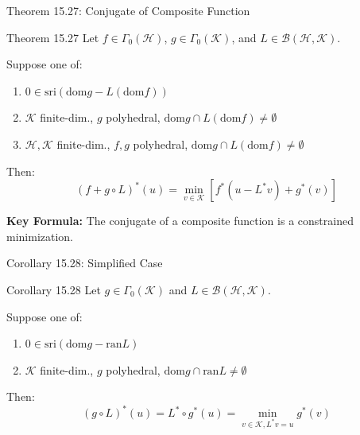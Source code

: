 \documentclass[aspectratio=169,10pt]{beamer}
\begin{document}
\begin{frame}{Theorem 15.27: Conjugate of Composite Function}
  \begin{block}{Theorem 15.27}
    Let $f \in \Gamma_0(\mathcal{H})$, $g \in \Gamma_0(\mathcal{K})$, and $L \in \mathcal{B}(\mathcal{H}, \mathcal{K})$.
    
    Suppose one of:
    \begin{enumerate}
      \item[(i)] $0 \in \text{sri}(\text{dom} g - L(\text{dom} f))$
      \item[(ii)] $\mathcal{K}$ finite-dim., $g$ polyhedral, $\text{dom} g \cap L(\text{dom} f) \neq \emptyset$
      \item[(iii)] $\mathcal{H}, \mathcal{K}$ finite-dim., $f, g$ polyhedral, $\text{dom} g \cap L(\text{dom} f) \neq \emptyset$
    \end{enumerate}
    
    Then:
    \[
      (f + g \circ L)^*(u) = \min_{v \in \mathcal{K}} [f^*(u - L^*v) + g^*(v)]
    \]
  \end{block}
  
  \vspace{0.3cm}
  \textbf{Key Formula:} The conjugate of a composite function is a constrained minimization.
\end{frame}

\begin{frame}{Corollary 15.28: Simplified Case}
  \begin{block}{Corollary 15.28}
    Let $g \in \Gamma_0(\mathcal{K})$ and $L \in \mathcal{B}(\mathcal{H}, \mathcal{K})$.
    
    Suppose one of:
    \begin{enumerate}
      \item[(i)] $0 \in \text{sri}(\text{dom} g - \text{ran} L)$
      \item[(ii)] $\mathcal{K}$ finite-dim., $g$ polyhedral, $\text{dom} g \cap \text{ran} L \neq \emptyset$
    \end{enumerate}
    
    Then:
    \[
      (g \circ L)^*(u) = L^* \circ g^*(u) = \min_{v \in \mathcal{K}, L^*v = u} g^*(v)
    \]
  \end{block}
\end{frame}

\end{document}
